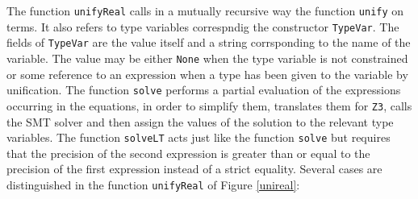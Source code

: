 The function \texttt{unifyReal} calls in  a mutually recursive way the function \texttt{unify}
on terms. It also refers to type variables correspndig the constructor \texttt{TypeVar}.
The fields of \texttt{TypeVar} are the value itself and a string corrsponding to
the name of the variable. The value may be either \texttt{None} when the type
variable is not constrained or some reference to an expression when a type has been given to the variable
by unification. The function \texttt{solve} performs a partial evaluation of the expressions
occurring in the equations, in order to simplify them, translates them for \texttt{Z3},
calls the SMT solver and then assign the values of the solution to the relevant type
variables. The function \texttt{solveLT} acts just like the function \texttt{solve} but
requires that the precision of the second expression is greater than or equal to the precision of the first
expression instead of a strict equality.
Several cases are distinguished in the function \texttt{unifyReal} of Figure \ref{unireal}:
